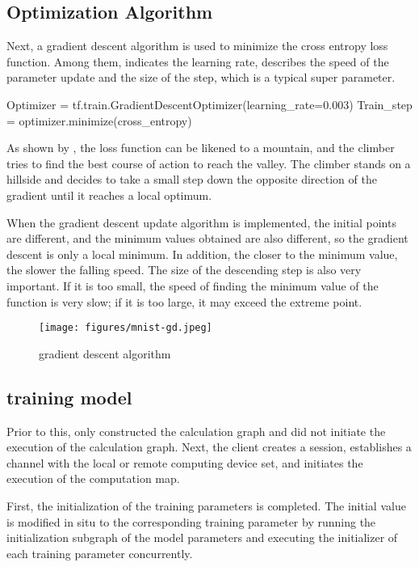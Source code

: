 \begin{content}
\begin{content}
\subsection{Optimization Algorithm}

Next, a gradient descent algorithm is used to minimize the cross entropy loss function. Among them,  indicates the learning rate, describes the speed of the parameter update and the size of the step, which is a typical super parameter.

\begin{leftbar}
\begin{python}
Optimizer = tf.train.GradientDescentOptimizer(learning_rate=0.003)
Train_step = optimizer.minimize(cross_entropy)
\end{python}
\end{leftbar}

As shown by , the loss function can be likened to a mountain, and the climber tries to find the best course of action to reach the valley. The climber stands on a hillside and decides to take a small step down the opposite direction of the gradient until it reaches a local optimum.

When the gradient descent update algorithm is implemented, the initial points are different, and the minimum values ​​obtained are also different, so the gradient descent is only a local minimum. In addition, the closer to the minimum value, the slower the falling speed. The size of the descending step is also very important. If it is too small, the speed of finding the minimum value of the function is very slow; if it is too large, it may exceed the extreme point.

\begin{figure}[H]
\centering
\texttt{[image: figures/mnist-gd.jpeg]}
\caption{gradient descent algorithm}
 \label{fig:mnist-gd}
\end{figure}

\subsection{training model}

Prior to this, \tf{} only constructed the calculation graph and did not initiate the execution of the calculation graph. Next, the client creates a session, establishes a channel with the local or remote computing device set, and initiates the execution of the computation map.

First, the initialization of the training parameters is completed. The initial value is modified in situ to the corresponding training parameter by running the initialization subgraph of the model parameters and executing the initializer of each training parameter concurrently.


\end{content}
\end{content}
